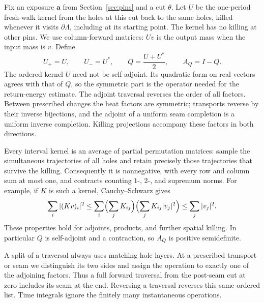 Fix an exposure \(\mathbf a\) from Section~\ref{sec:pins} and a cut
\(\theta\).  Let \(U\) be the one-period fresh-walk kernel from the
holes at this cut back to the same holes, killed whenever it visits
\(\partial\Lambda\), including at its starting point.  The kernel
has no killing at other pins.  We use column-forward matrices: \(Uv\)
is the output mass when the input mass is \(v\).  Define
\begin{equation}\label{eq:one-period}
 U_+=U,\qquad U_-=U^*,\qquad
 Q=\frac{U+U^*}{2},\qquad A_Q=I-Q.
\end{equation}
The ordered kernel $U$ need not be self-adjoint. Its quadratic form
on real vectors agrees with that of $Q$, so the symmetric part is the
operator needed for the return-energy estimate.
The adjoint traversal reverses the order of all factors.  Between
prescribed changes the heat factors are symmetric; transports reverse
by their inverse bijections, and the adjoint of a uniform seam completion
is a uniform inverse completion.  Killing projections accompany these
factors in both directions.

Every interval kernel is an average of partial permutation matrices:
sample the simultaneous trajectories of all holes and retain precisely
those trajectories that survive the killing.  Consequently it is
nonnegative, with every row and column sum at most one, and contracts
counting \(1\)-, \(2\)-, and supremum norms.  For example, if \(K\)
is such a kernel, Cauchy--Schwarz gives
\[
 \sum_i|(Kv)_i|^2
 \le\sum_i\Bigl(\sum_jK_{ij}\Bigr)
              \Bigl(\sum_jK_{ij}|v_j|^2\Bigr)
 \le\sum_j|v_j|^2.
\]
These properties hold for adjoints, products, and further spatial
killing.  In particular \(Q\) is self-adjoint and a contraction, so
\(A_Q\) is positive semidefinite.

A split of a traversal always uses matching hole layers.  At a prescribed
transport or seam we distinguish its two sides and assign the operation
to exactly one of the adjoining factors.  Thus a full forward traversal
from the post-seam cut at zero includes its seam at the end.  Reversing
a traversal reverses this same ordered list.  Time integrals ignore the
finitely many instantaneous operations.

